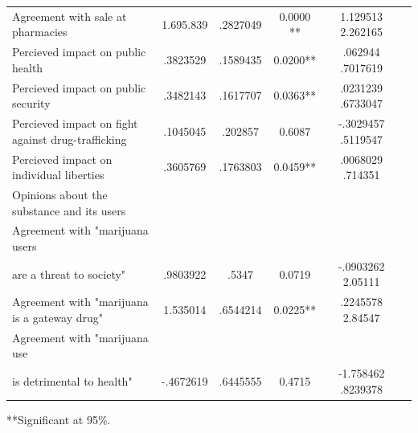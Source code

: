 \documentclass[11pt]{article}
\begin{document}
\begin{table}
\begin{small}
\begin{tabular}{lccccc}
Agreement with sale at pharmacies	&	1.695.839	&	.2827049	&	0.0000 **	&	 1.129513    2.262165		\\	
Percieved impact on public health 	&	.3823529 	&	.1589435 	&	0.0200**	&	.062944    .7017619		\\	
Percieved impact on public security 	&	.3482143	&	.1617707	&	0.0363**	&	.0231239    .6733047		\\	
Percieved impact on fight against drug-trafficking	&	.1045045	&	.202857	&	0.6087	&	-.3029457    .5119547		\\	
Percieved impact on individual liberties	&	.3605769	&	.1763803	&	 0.0459**	&	 .0068029     .714351		\\	
Opinions about the substance and its users	&		&		&		&			\\	
Agreement with "marijuana users	&		&		&		&			\\	\hline
are a threat to society"	&	.9803922	&	 .5347	&	0.0719	&	-.0903262     2.05111		\\	
Agreement with "marijuana is a gateway drug"	&	1.535014	&	.6544214	&	0.0225** 	&	.2245578     2.84547		\\	
Agreement with "marijuana use 	&		&		&		&			\\	
is detrimental to health"	&	-.4672619	&	.6445555	&	0.4715	&	-1.758462    .8239378		\\	\hline
\end{tabular}
**Significant at 95\%.
\end{small}
\end{table}
\end{document}
